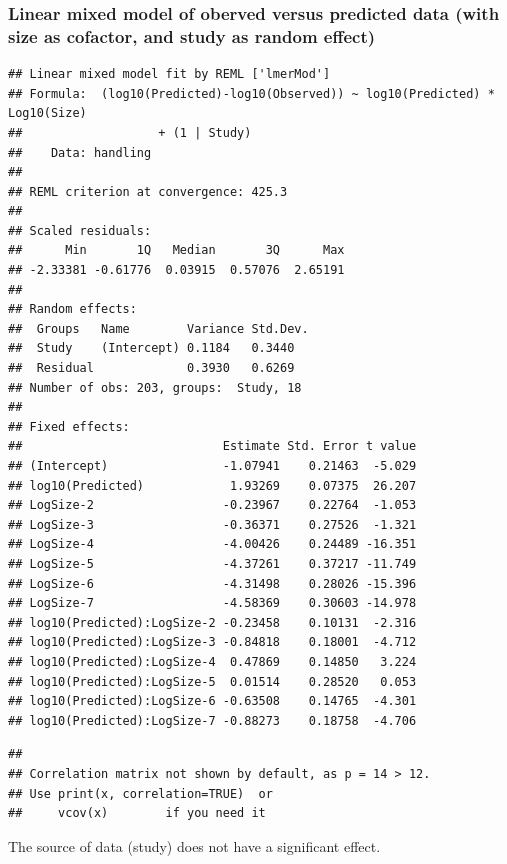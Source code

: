 \documentclass[utf8, 12 pt]{frontiers_suppmat}
\begin{document}
\hypertarget{linear-mixed-model-of-oberved-versus-predicted-data-with-size-as-cofactor-and-study-as-random-effect-1}{%
\subsubsection{Linear mixed model of oberved versus predicted data (with
size as cofactor, and study as random
effect)}\label{linear-mixed-model-of-oberved-versus-predicted-data-with-size-as-cofactor-and-study-as-random-effect-1}}

\begin{verbatim}
## Linear mixed model fit by REML ['lmerMod']
## Formula:  (log10(Predicted)-log10(Observed)) ~ log10(Predicted) * Log10(Size)
##                   + (1 | Study)
##    Data: handling
## 
## REML criterion at convergence: 425.3
## 
## Scaled residuals: 
##      Min       1Q   Median       3Q      Max 
## -2.33381 -0.61776  0.03915  0.57076  2.65191 
## 
## Random effects:
##  Groups   Name        Variance Std.Dev.
##  Study    (Intercept) 0.1184   0.3440  
##  Residual             0.3930   0.6269  
## Number of obs: 203, groups:  Study, 18
## 
## Fixed effects:
##                            Estimate Std. Error t value
## (Intercept)                -1.07941    0.21463  -5.029
## log10(Predicted)            1.93269    0.07375  26.207
## LogSize-2                  -0.23967    0.22764  -1.053
## LogSize-3                  -0.36371    0.27526  -1.321
## LogSize-4                  -4.00426    0.24489 -16.351
## LogSize-5                  -4.37261    0.37217 -11.749
## LogSize-6                  -4.31498    0.28026 -15.396
## LogSize-7                  -4.58369    0.30603 -14.978
## log10(Predicted):LogSize-2 -0.23458    0.10131  -2.316
## log10(Predicted):LogSize-3 -0.84818    0.18001  -4.712
## log10(Predicted):LogSize-4  0.47869    0.14850   3.224
## log10(Predicted):LogSize-5  0.01514    0.28520   0.053
## log10(Predicted):LogSize-6 -0.63508    0.14765  -4.301
## log10(Predicted):LogSize-7 -0.88273    0.18758  -4.706
\end{verbatim}

\begin{verbatim}
## 
## Correlation matrix not shown by default, as p = 14 > 12.
## Use print(x, correlation=TRUE)  or
##     vcov(x)        if you need it
\end{verbatim}
The source of data (study) does not have a significant effect.
\end{document}
